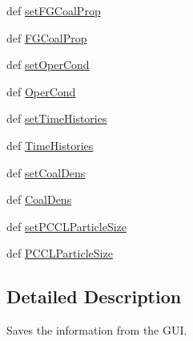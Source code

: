 \begin{DoxyCompactItemize}
\item 
def \hyperlink{classPKPgui_1_1InfosFromGUI_a5d367829f09a0cee1fdc9318840dd28f}{set\-F\-G\-Coal\-Prop}
\item 
def \hyperlink{classPKPgui_1_1InfosFromGUI_a6416b4600c3e151223eeebf3264d4445}{\-F\-G\-Coal\-Prop}
\item 
def \hyperlink{classPKPgui_1_1InfosFromGUI_a1461002e92692d2e2a028e7b2c639f9b}{set\-Oper\-Cond}
\item 
def \hyperlink{classPKPgui_1_1InfosFromGUI_aa50b3a10e7ced337b11b0650aac95d38}{\-Oper\-Cond}
\item 
def \hyperlink{classPKPgui_1_1InfosFromGUI_af0559de04bb8c1c057cbdcd5e0999ed7}{set\-Time\-Histories}
\item 
def \hyperlink{classPKPgui_1_1InfosFromGUI_ae32340e05d660bdcb47abc6820910425}{\-Time\-Histories}
\item 
def \hyperlink{classPKPgui_1_1InfosFromGUI_a643da03cb74d0370edc9d8b3c13807e8}{set\-Coal\-Dens}
\item 
def \hyperlink{classPKPgui_1_1InfosFromGUI_aa46af00436373963a40877377bf7fd0f}{\-Coal\-Dens}
\item 
def \hyperlink{classPKPgui_1_1InfosFromGUI_a8747ebd09fd4e63f195074b1e5fc8ec0}{set\-P\-C\-C\-L\-Particle\-Size}
\item 
def \hyperlink{classPKPgui_1_1InfosFromGUI_a8f80f0f8c816893a8b5f08ea2257ea5a}{\-P\-C\-C\-L\-Particle\-Size}
\end{DoxyCompactItemize}


\subsection{\-Detailed \-Description}
\begin{DoxyVerb}Saves the information from the GUI.\end{DoxyVerb}
 

